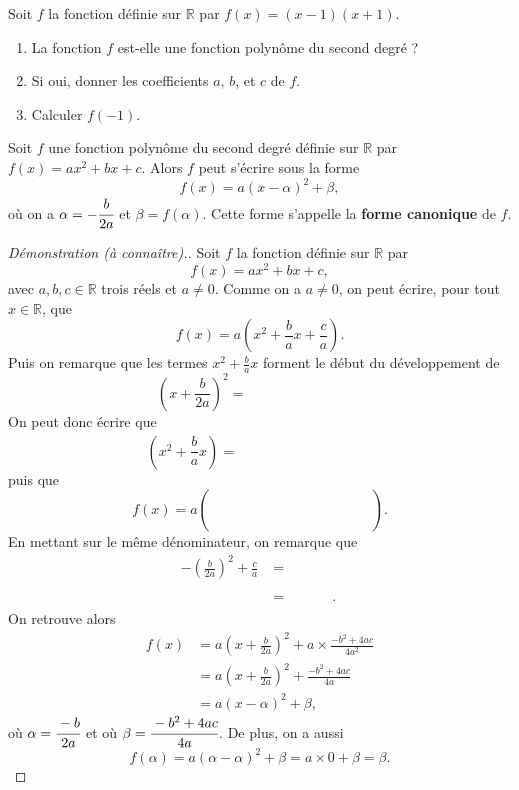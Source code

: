 \documentclass[11pt]{article}
\begin{document}
\begin{app}
  Soit $f$ la fonction définie sur $\mathbb{R}$ par $f(x) = (x-1)(x+1)$.
  \begin{enumerate}
    \item La fonction $f$ est-elle une fonction polynôme du second degré ?
    \item Si oui, donner les coefficients $a$, $b$, et $c$ de $f$.
    \item Calculer $f(-1)$.
  \end{enumerate}
\end{app}

\begin{prop}
  Soit $f$ une fonction polynôme du second degré définie sur $\mathbb{R}$ par
  \(
    f(x) = ax^2+bx+c.
  \)
  Alors $f$ peut s'écrire sous la forme
  \[
    f(x) = a(x-\alpha)^2+\beta,
  \]
  où on a $\alpha=-\cfrac{b}{2a}$ et $\beta=f(\alpha)$. Cette forme s'appelle la
  \textbf{forme canonique} de $f$.
\end{prop}

\begin{proof}[Démonstration (à connaître).]
  Soit $f$ la fonction définie sur $\mathbb{R}$ par
  \[
    f(x) = ax^2+bx+c,
  \]
  avec $a,b,c\in\mathbb{R}$ trois réels et $a\neq0$. Comme on a $a\neq0$, on
  peut écrire, pour tout $x\in\mathbb{R}$, que
  \[
    f(x) = a\left( x^2+\frac{b}{a}x+\frac{c}{a} \right).
  \]
  Puis on remarque que les termes $x^2+\frac{b}{a}x$ forment le début du
  développement de
  \[
    \left(x+\frac{b}{2a}\right)^2 = \phantom{x^2 +
      \frac{b}{a}x+\left(\frac{b}{2a}\right)^2.}
  \]
  On peut donc écrire que
  \[
    \left( x^2+\frac{b}{a}x \right) = \phantom{\left( x+\frac{b}{2a} \right)^2-\left(
    \frac{b}{2a} \right)^2}
  \]
  puis que
  \[
    f(x) = a\left(\phantom{ \left( x+\frac{b}{2a} \right)^2-\left( \frac{b}{2a}
    \right)^2+\frac{c}{a}} \right).
  \]
  En mettant sur le même dénominateur, on remarque que
  \begin{align*}
    -\left( \frac{b}{2a} \right)^2+\frac{c}{a} &= \phantom{-\frac{b^2}{4a^2} +
    \frac{c}{a}} \\
    &= \phantom{\frac{-b^2+4ac}{4a^2}}.
 \end{align*}
 On retrouve alors
 \begin{align*}
   f(x) &= a\left( x+\frac{b}{2a} \right)^2+a\times\frac{-b^2+4ac}{4a^2} \\
   &= a\left( x+\frac{b}{2a} \right)^2+\frac{-b^2+4ac}{4a} \\
   &= a\left( x-\alpha \right)^2+\beta,
 \end{align*}
 où $\alpha=\cfrac{-b}{2a}$ et où $\beta=\cfrac{-b^2+4ac}{4a}$. De plus, on a
 aussi 
 \[
   f(\alpha) = a\left( \alpha-\alpha \right)^2+\beta= a\times 0+\beta=\beta.
 \]
\end{proof}
\end{document}
